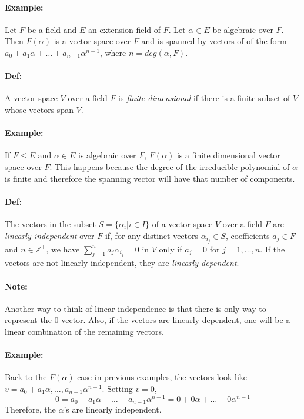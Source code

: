 \documentclass[10pt,a4paper]{article}
\begin{document}
\paragraph{Example:}  Let $F$ be a field and $E$ an extension field of $F$. Let $\alpha \in E$ be algebraic over $F$. Then $F(\alpha)$ is a vector space over $F$ and is spanned by vectors of of the form $a_0+a_1\alpha+ \dots+ a_{n-1}\alpha^{n-1}$, where $n=deg(\alpha, F)$.

\paragraph{Def:} A vector space $V$ over a field $F$ is \textit{finite dimensional} if there is a finite subset of $V$ whose vectors span $V$.

\paragraph{Example:} If $F \leq E$ and $\alpha \in E$ is algebraic over $F$, $F(\alpha)$ is a finite dimensional vector space over $F$. This happens because the degree of the irreducible polynomial of $\alpha$ is finite and therefore the spanning vector will have that number of components.

\paragraph{Def:} The vectors in the subset $S = \{ \alpha_i | i\in I\}$ of a vector space $V$ over a field $F$ are \textit{linearly independent} over $F$ if, for any distinct vectors $\alpha_{i_j} \in S$, coefficients $a_j \in F$ and $n \in \mathbb{Z}^+$, we have $\sum_{j=1}^n a_j \alpha_{i_j} = 0$ in $V$ only if $a_j =0$ for $j= 1,\dots,n$. If the vectors are not linearly independent, they are \textit{linearly dependent}.

\paragraph{Note:} Another way to think of linear independence is that there is only way to represent the 0 vector. Also, if the vectors are linearly dependent, one will be a linear combination of the remaining vectors.

\paragraph{Example:} Back to the $F(\alpha)$ case in previous examples, the vectors look like $v =a_0+a_1\alpha, \dots, a_{n-1}\alpha^{n-1}$. Setting $v=0$,
$$0 = a_0+a_1\alpha+ \dots+ a_{n-1}\alpha^{n-1} = 0+0\alpha+ \dots+ 0\alpha^{n-1}$$
Therefore, the $\alpha$'s are linearly independent.
\end{document}
